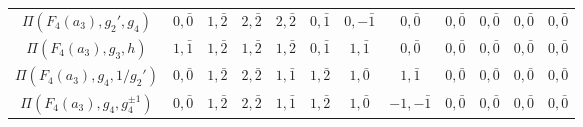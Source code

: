 \begin{table}[!ht]
\begin{adjustbox}{max width=\linewidth}
\begin{tabular}{|c|ccc|cccc|cccc|}
        $\Pi(F_4(a_3),g_2',g_4)$  & $0,\bar0$ & $1,\bar2$ & $2,\bar2$ & $2,\bar2$ & $0,\bar1$ & $0,-\bar1$ & $0,\bar0$ & $0,\bar0$ & $0,\bar0$ & $0,\bar0$ & $0,\bar0$ \\\hdashline
        $\Pi(F_4(a_3),g_3,h)$  & $1,\bar1$ & $1,\bar2$ & $1,\bar2$ & $1,\bar2$ & $0,\bar1$ & $1,\bar1$ & $0,\bar0$ & $0,\bar0$ & $0,\bar0$ & $0,\bar0$ & $0,\bar0$ \\\hdashline
        $\Pi(F_4(a_3),g_4,1/g_2')$ & {$0,\bar0$} & {$1,\bar2$} & {$2,\bar2$} & {$1,\bar1$} & {$1,\bar2$} & {$1,\bar0$} & {$1,\bar1$} & {$0,\bar0$} & {$0,\bar0$} & {$0,\bar0$} & {$0,\bar0$} \\
        $\Pi(F_4(a_3),g_4,g_4^{\pm1})$ & {$0,\bar0$} & {$1,\bar2$} & {$2,\bar2$} & {$1,\bar1$} & {$1,\bar2$} & {$1,\bar0$} & {$-1,-\bar1$} & {$0,\bar0$} & {$0,\bar0$} & {$0,\bar0$} & {$0,\bar0$} \\\hline
        \end{tabular}
        \end{adjustbox}
    \end{table}
